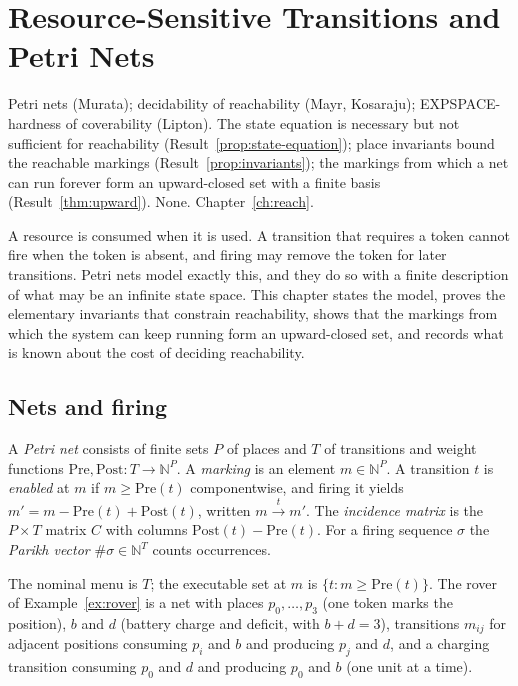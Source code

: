 \chapter{Resource-Sensitive Transitions and Petri Nets}\label{ch:petri}
{Petri nets (Murata); decidability of reachability (Mayr, Kosaraju); EXPSPACE-hardness of coverability (Lipton).}
{The state equation is necessary but not sufficient for reachability (Result~\ref{prop:state-equation}); place invariants bound the reachable markings (Result~\ref{prop:invariants}); the markings from which a net can run forever form an upward-closed set with a finite basis (Result~\ref{thm:upward}).}
{None.}
{Chapter~\ref{ch:reach}.}

A resource is consumed when it is used. A transition that requires a token cannot fire when the token is absent, and firing may remove the token for later transitions. Petri nets model exactly this, and they do so with a finite description of what may be an infinite state space. This chapter states the model, proves the elementary invariants that constrain reachability, shows that the markings from which the system can keep running form an upward-closed set, and records what is known about the cost of deciding reachability.

\section{Nets and firing}

\begin{definition}\label{def:petri}
A \emph{Petri net} consists of finite sets $P$ of places and $T$ of transitions and weight functions $\mathrm{Pre},\mathrm{Post}:T\to\mathbb N^{P}$. A \emph{marking} is an element $m\in\mathbb N^{P}$. A transition $t$ is \emph{enabled} at $m$ if $m\ge\mathrm{Pre}(t)$ componentwise, and firing it yields $m'=m-\mathrm{Pre}(t)+\mathrm{Post}(t)$, written $m\xrightarrow{t}m'$. The \emph{incidence matrix} is the $P\times T$ matrix $C$ with columns $\mathrm{Post}(t)-\mathrm{Pre}(t)$. For a firing sequence $\sigma$ the \emph{Parikh vector} $\#\sigma\in\mathbb N^{T}$ counts occurrences.
\end{definition}

The nominal menu is $T$; the executable set at $m$ is $\{t:m\ge\mathrm{Pre}(t)\}$. The rover of Example~\ref{ex:rover} is a net with places $p_0,\dots,p_3$ (one token marks the position), $b$ and $d$ (battery charge and deficit, with $b+d=3$), transitions $m_{ij}$ for adjacent positions consuming $p_i$ and $b$ and producing $p_j$ and $d$, and a charging transition consuming $p_0$ and $d$ and producing $p_0$ and $b$ (one unit at a time).

